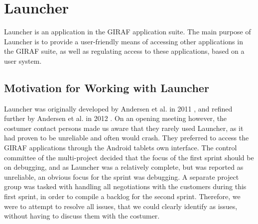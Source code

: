 \section{Launcher}
Launcher is an application in the GIRAF application suite.
The main purpose of Launcher is to provide a user-friendly means of accessing other applications in the GIRAF suite, as well as regulating access to these applications, based on a user system.

\subsection{Motivation for Working with Launcher}
Launcher was originally developed by Andersen et al. in 2011 \cite{launcher2011}, and refined further by Andersen et al. in 2012 \cite{launcher2012}.
On an opening meeting however, the costumer contact persons made us aware that they rarely used Launcher, as it had proven to be unreliable and often would crash. 
They preferred to access the GIRAF applications through the Android tablets own interface.
The control committee of the multi-project decided that the focus of the first sprint should be on debugging, and as Launcher was a relatively complete, but was reported as unreliable, an obvious focus for the sprint was debugging. 
A separate project group was tasked with handling all negotiations with the customers during this first sprint, in order to compile a backlog for the second sprint.
Therefore, we were to attempt to resolve all issues, that we could clearly identify as issues, without having to discuss them with the costumer.

